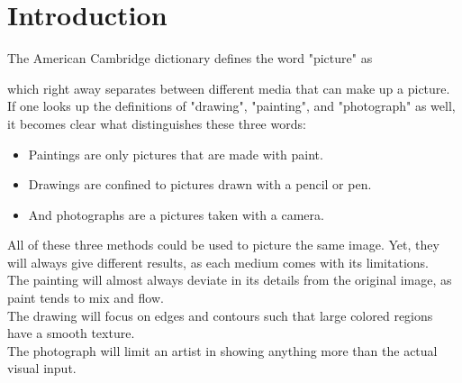 \chapter{Introduction}


The American Cambridge dictionary defines the word "picture" as
    
 
which right away separates between different media that can make up a picture.
If one looks up the definitions of "drawing", "painting", and "photograph" as well, it becomes clear what distinguishes these three words:
\begin{itemize}
\item Paintings are only pictures that are made with paint.
\item Drawings are confined to pictures drawn with a pencil or pen.
\item And photographs are a pictures taken with a camera.
\end{itemize}

All of these three methods could be used to picture the same image.
Yet, they will always give different results, as each medium comes with its limitations.\\
The painting will almost always deviate in its details from the original image, as paint tends to mix and flow.\\
The drawing will focus on edges and contours such that large colored regions have a smooth texture.\\
The photograph will limit an artist in showing anything more than the actual visual input.\\

